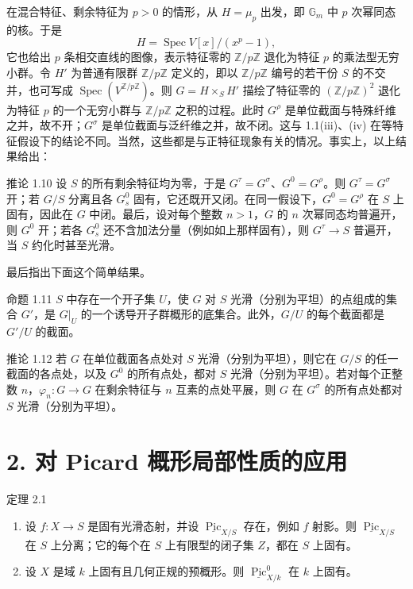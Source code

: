 在混合特征、剩余特征为 $p>0$ 的情形，从 $H=\mu_p$ 出发，即 $\mathbb G_m$ 中 $p$ 次幂同态的核。于是
\[
 H=\operatorname{Spec}V[x]/(x^p-1),
\]
它也给出 $p$ 条相交直线的图像，表示特征零的 $\mathbb Z/p\mathbb Z$ 退化为特征 $p$ 的乘法型无穷小群。令 $H'$ 为普通有限群 $\mathbb Z/p\mathbb Z$ 定义的，即以 $\mathbb Z/p\mathbb Z$ 编号的若干份 $S$ 的不交并，也可写成 $\operatorname{Spec}(V^{\mathbb Z/p\mathbb Z})$。则 $G=H\times_SH'$ 描绘了特征零的 $(\mathbb Z/p\mathbb Z)^2$ 退化为特征 $p$ 的一个无穷小群与 $\mathbb Z/p\mathbb Z$ 之积的过程。此时 $G^\rho$ 是单位截面与特殊纤维之并，故不开；$G^\sigma$ 是单位截面与泛纤维之并，故不闭。这与 1.1(iii)、(iv) 在等特征假设下的结论不同。当然，这些都是与正特征现象有关的情况。事实上，以上结果给出：

\begin{statement}{推论 1.10}
设 $S$ 的所有剩余特征均为零，于是 $G^\tau=G^\sigma$、$G^0=G^\rho$。则 $G^\tau=G^\sigma$ 开；若 $G/S$ 分离且各 $G_s^0$ 固有，它还既开又闭。在同一假设下，$G^0=G^\rho$ 在 $S$ 上固有，因此在 $G$ 中闭。最后，设对每个整数 $n>1$，$G$ 的 $n$ 次幂同态均普遍开，则 $G^0$ 开；若各 $G_s^0$ 还不含加法分量（例如如上那样固有），则 $G^\tau\to S$ 普遍开，当 $S$ 约化时甚至光滑。
\end{statement}

最后指出下面这个简单结果。
\begin{statement}{命题 1.11}
$S$ 中存在一个开子集 $U$，使 $G$ 对 $S$ 光滑（分别为平坦）的点组成的集合 $G'$，是 $G|_U$ 的一个诱导开子群概形的底集合。此外，$G/U$ 的每个截面都是 $G'/U$ 的截面。
\end{statement}

\begin{statement}{推论 1.12}
若 $G$ 在单位截面各点处对 $S$ 光滑（分别为平坦），则它在 $G/S$ 的任一截面的各点处，以及 $G^0$ 的所有点处，都对 $S$ 光滑（分别为平坦）。若对每个正整数 $n$，$\varphi_n\colon G\to G$ 在剩余特征与 $n$ 互素的点处平展，则 $G$ 在 $G^\sigma$ 的所有点处都对 $S$ 光滑（分别为平坦）。
\end{statement}

\section*{2. 对 Picard 概形局部性质的应用}
\begin{statement}{定理 2.1}
\begin{enumerate}
\item[(i)] 设 $f\colon X\to S$ 是固有光滑态射，并设 $\underline{\operatorname{Pic}}_{X/S}$ 存在，例如 $f$ 射影。则 $\underline{\operatorname{Pic}}_{X/S}$ 在 $S$ 上分离；它的每个在 $S$ 上有限型的闭子集 $Z$，都在 $S$ 上固有。
\item[(ii)] 设 $X$ 是域 $k$ 上固有且几何正规的预概形。则 $\underline{\operatorname{Pic}}^0_{X/k}$ 在 $k$ 上固有。
\end{enumerate}
\end{statement}

